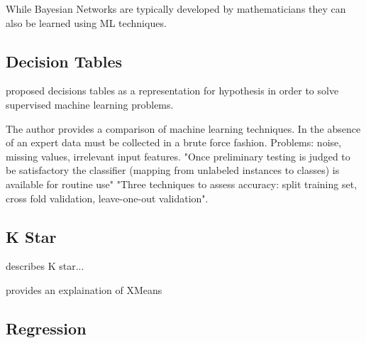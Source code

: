 While Bayesian Networks are typically developed by mathematicians they can also be learned using ML techniques. 


\subsection{Decision Tables}

\cite{kohavi1995power} proposed decisions tables as a representation for hypothesis in order to solve supervised machine learning problems. 



The author provides a comparison of machine learning techniques.
In the absence of an expert data must be collected in a brute force fashion. Problems: noise, missing values, irrelevant input features.
"Once preliminary testing is judged to be satisfactory the classifier (mapping from unlabeled instances to classes) is available for routine use"
"Three techniques to assess accuracy: split training set, cross fold validation, leave-one-out validation".

\subsection{K Star}

\cite{cleary1995k} describes K star...

\cite{Multilayer Perceptron}






% 
%






%

%




\cite{pelleg2000x} provides an explaination of XMeans







\subsection{Regression}

